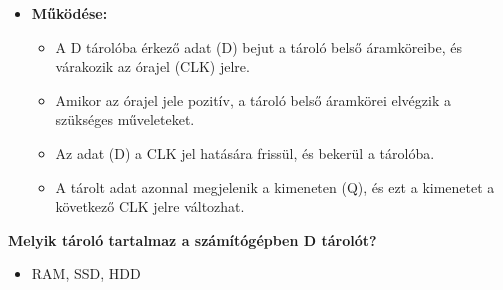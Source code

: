 \documentclass[11pt,a4paper]{article}
\begin{document}
            \begin{tcolorbox}[colback=blue!5!white,colframe=blue!50!black,title= 11. Ismertesse a D tároló felépítését és működését!]
                \begin{itemize}
                    \item \textbf{Működése:}
                    \begin{itemize}
                        \item A D tárolóba érkező adat (D) bejut a tároló belső áramköreibe, és várakozik az órajel (CLK) jelre.
                        \item Amikor az órajel jele pozitív, a tároló belső áramkörei elvégzik a szükséges műveleteket.
                        \item Az adat (D) a CLK jel hatására frissül, és bekerül a tárolóba.
                        \item A tárolt adat azonnal megjelenik a kimeneten (Q), és ezt a kimenetet a következő CLK jelre változhat.
                    \end{itemize}
                \end{itemize}
                \begin{center}
                \end{center}
                \textbf{Melyik tároló tartalmaz a számítógépben D tárolót?}
                \begin{itemize}
                    \item RAM, SSD, HDD
                \end{itemize}
            \end{tcolorbox}
            
\end{document}
